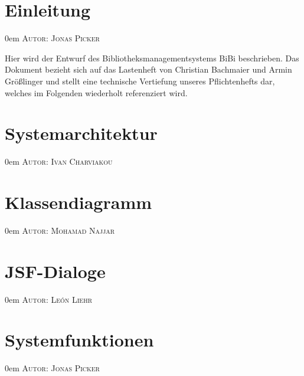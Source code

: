 \documentclass{article}
\makeatletter
\newcommand{\sectionauthor}[1]{
	{\parindent 0em \large \scshape Autor: #1 \par \nobreak \vspace*{1em}}
	\@afterheading
}
\makeatother
\begin{document}
\section{Einleitung}
\sectionauthor{Jonas Picker}
Hier wird der Entwurf des Bibliotheksmanagementsystems BiBi beschrieben. Das Dokument bezieht sich auf das Lastenheft von Christian Bachmaier und Armin Größlinger und stellt eine technische Vertiefung unseres Pflichtenhefts dar, welches im Folgenden wiederholt referenziert wird. 

\section{Systemarchitektur}
\sectionauthor{Ivan Charviakou}

\section{Klassendiagramm}
\sectionauthor{Mohamad Najjar}

\section{JSF-Dialoge}
\sectionauthor{León Liehr}


\section{Systemfunktionen}
\sectionauthor{Jonas Picker}
\end{document}
